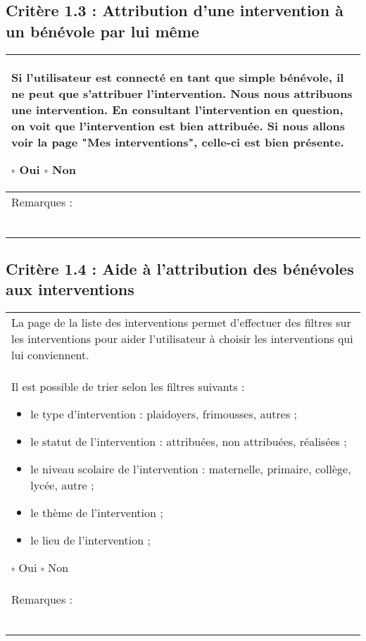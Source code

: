 	\subsection*{Critère 1.3 : Attribution d’une intervention à un bénévole par lui même}
	
		\begin{center}
    	 		\begin{tabular}[h]{|p{}|}
			\hline
				Si l’utilisateur est connecté en tant que simple bénévole, il ne peut que s’attribuer l’intervention.
Nous nous attribuons une intervention.
En consultant l’intervention en question, on voit que l’intervention est bien attribuée.
Si nous allons voir la page "Mes interventions", celle-ci est bien présente.
				
				$\square$ Oui \hfill \hfill $\square$ Non \\\hline Remarques : \\ ~\\
			 \\\hline
     		\end{tabular}
  		\end{center}	

	\subsection*{Critère 1.4 : Aide à l’attribution des bénévoles aux interventions}
	
		\begin{center}
    	 		\begin{tabular}[h]{|p{}|}
			\hline
				La page de la liste des interventions permet d’effectuer des filtres sur les interventions pour aider l’utilisateur à choisir les interventions qui lui conviennent.\\
Il est possible de trier selon les filtres suivants :
		\begin{itemize}
			\item le type d’intervention : plaidoyers, frimousses, autres ;
			\item le statut de l’intervention : attribuées, non attribuées, réalisées ;
			\item le niveau scolaire de l’intervention : maternelle, primaire, collège, lycée, autre ;
			\item le thème de l’intervention ;
			\item le lieu de l’intervention ;
		\end{itemize}
				
				$\square$ Oui \hfill \hfill $\square$ Non \\\hline Remarques : \\ ~\\
			 \\\hline
     		\end{tabular}
  		\end{center}	

